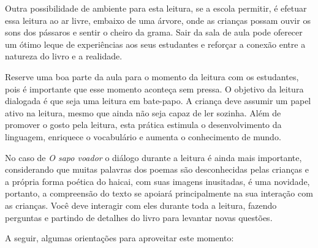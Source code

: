 \documentclass[11pt]{extarticle}
\begin{document}

Outra possibilidade de ambiente para esta leitura, se a escola permitir, 
é efetuar essa leitura ao ar livre, embaixo de uma árvore, onde as crianças 
possam ouvir os sons dos pássaros e sentir o cheiro da grama. Sair da sala 
de aula pode oferecer um ótimo leque de experiências aos seus estudantes e 
reforçar a conexão entre a natureza do livro e a realidade.  

Reserve uma boa parte da aula para o momento da leitura com os estudantes, 
pois é importante que esse momento aconteça sem pressa. O objetivo da 
leitura dialogada é que seja uma leitura em bate-papo. A criança deve 
assumir um papel ativo na leitura, mesmo que ainda não seja capaz de 
ler sozinha. Além de promover o gosto pela leitura, esta prática estimula 
o desenvolvimento da linguagem, enriquece o vocabulário e 
aumenta o conhecimento de mundo.

No caso de \textit{O sapo voador} o diálogo durante a leitura é 
ainda mais importante, considerando que muitas palavras dos poemas são desconhecidas pelas crianças e a própria forma poética do haicai, com suas imagens inusitadas, é uma novidade, portanto, a compreensão do texto se apoiará principalmente na sua interação com as crianças. 
Você deve interagir com eles durante toda a 
leitura, fazendo perguntas e partindo de detalhes do livro para 
levantar novas questões. 

A seguir, algumas orientações para aproveitar este momento: 
\end{document}
